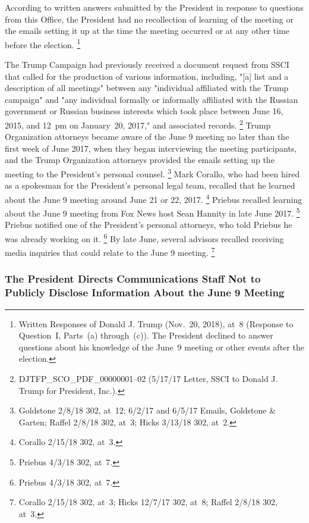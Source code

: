 {According to written answers submitted by the President in response to questions from this Office, the President had no recollection of learning of the meeting or the emails setting it up at the time the meeting occurred or at any other time before the election.%
\footnote{Written Responses of Donald J. Trump (Nov.~20, 2018), at~8 (Response to Question~I, Parts~(a) through~(c)).
The President declined to answer questions about his knowledge of the June~9 meeting or other events after the election.}

The Trump Campaign had previously received a document request from SSCI that called for the production of various information, including, "[a] list and a description of all meetings" between any "individual affiliated with the Trump campaign" and "any individual formally or informally affiliated with the Russian government or Russian business interests which took place between June 16, 2015, and 12~pm on January~20, 2017," and associated records.%
\footnote{DJTFP\_SCO\_PDF\_00000001--02 (5/17/17 Letter, SSCI to Donald J. Trump for President, Inc.).}
Trump Organization attorneys became aware of the June 9 meeting no later than the first week of June 2017, when they began interviewing the meeting participants, and the Trump Organization attorneys provided the emails setting up the meeting to the President's personal counsel.%
\footnote{Goldstone 2/8/18 302, at~12;
6/2/17 and 6/5/17 Emails, Goldstone \& Garten;
Raffel 2/8/18 302, at~3;
Hicks 3/13/18 302, at~2.}
Mark Corallo, who had been hired as a spokesman for the President's personal legal team, recalled that he learned about the June 9 meeting around June 21 or 22, 2017.%
\footnote{Corallo 2/15/18 302, at~3.}
Priebus recalled learning about the June 9 meeting from Fox News host Sean Hannity in late June 2017.%
\footnote{Priebus 4/3/18 302, at~7.}
Priebus notified one of the President's personal attorneys, who told Priebus he was already working on it.%
\footnote{Priebus 4/3/18 302, at~7.}
By late June, several advisors recalled receiving media inquiries that could relate to the June 9 meeting.%
\footnote{Corallo 2/15/18 302, at~3;
Hicks 12/7/17 302, at~8;
Raffel 2/8/18 302, at~3.}

\subsubsection{The President Directs Communications Staff Not to Publicly Disclose Information About the June 9 Meeting}

}

